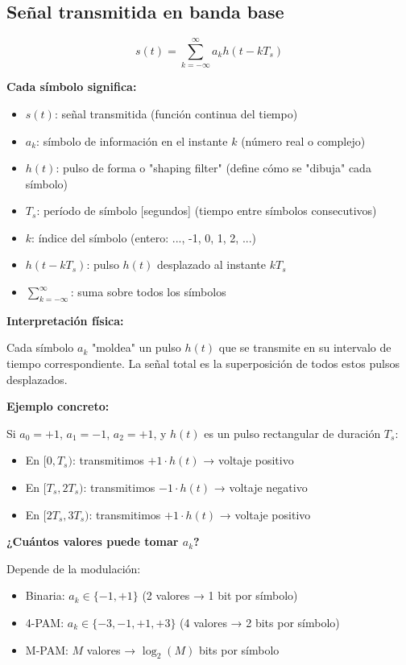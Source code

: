 \documentclass[11pt,a4paper]{article}
\begin{document}
\subsection{Señal transmitida en banda base}

\begin{tcolorbox}[colback=verdeclaro!20,colframe=azuloscuro,title=\textbf{Señal banda base}]
$$\boxed{s(t) = \sum_{k=-\infty}^{\infty} a_k h(t-kT_s)}$$

\textbf{Cada símbolo significa:}
\begin{itemize}
\item $s(t)$: señal transmitida (función continua del tiempo)
\item $a_k$: símbolo de información en el instante $k$ (número real o complejo)
\item $h(t)$: pulso de forma o "shaping filter" (define cómo se "dibuja" cada símbolo)
\item $T_s$: período de símbolo [segundos] (tiempo entre símbolos consecutivos)
\item $k$: índice del símbolo (entero: ..., -1, 0, 1, 2, ...)
\item $h(t-kT_s)$: pulso $h(t)$ desplazado al instante $kT_s$
\item $\sum_{k=-\infty}^{\infty}$: suma sobre todos los símbolos
\end{itemize}

\textbf{Interpretación física:}

Cada símbolo $a_k$ "moldea" un pulso $h(t)$ que se transmite en su intervalo de tiempo correspondiente. La señal total es la superposición de todos estos pulsos desplazados.

\textbf{Ejemplo concreto:}

Si $a_0 = +1$, $a_1 = -1$, $a_2 = +1$, y $h(t)$ es un pulso rectangular de duración $T_s$:
\begin{itemize}
\item En $[0, T_s)$: transmitimos $+1 \cdot h(t)$ → voltaje positivo
\item En $[T_s, 2T_s)$: transmitimos $-1 \cdot h(t)$ → voltaje negativo
\item En $[2T_s, 3T_s)$: transmitimos $+1 \cdot h(t)$ → voltaje positivo
\end{itemize}

\textbf{¿Cuántos valores puede tomar $a_k$?}

Depende de la modulación:
\begin{itemize}
\item Binaria: $a_k \in \{-1, +1\}$ (2 valores → 1 bit por símbolo)
\item 4-PAM: $a_k \in \{-3, -1, +1, +3\}$ (4 valores → 2 bits por símbolo)
\item M-PAM: $M$ valores → $\log_2(M)$ bits por símbolo
\end{itemize}
\end{tcolorbox}
\end{document}
